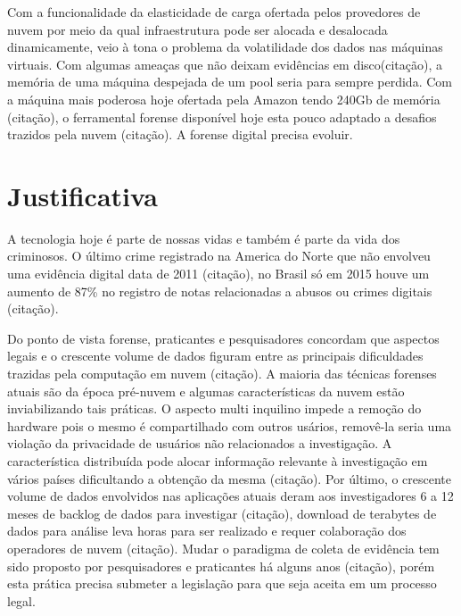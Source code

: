 \documentclass[
	12pt,				%
	openright,			%
	oneside,			%
	a4paper,			%
	english,			%
	french,				%
	spanish,			%
	brazil,				%
	]{abntex2}
\begin{document}
\par

Com a funcionalidade da elasticidade de carga ofertada pelos provedores de nuvem por meio da qual infraestrutura pode ser alocada e desalocada dinamicamente, veio à tona o problema
da volatilidade dos dados nas máquinas virtuais. Com algumas ameaças que não deixam evidências em disco(citação), a memória de uma máquina despejada de um pool seria para sempre
perdida. Com a máquina mais poderosa hoje ofertada pela Amazon tendo 240Gb de memória (citação), o ferramental forense disponível hoje esta pouco adaptado a desafios trazidos 
pela nuvem (citação). A forense digital precisa evoluir.

\chapter{Justificativa}

A tecnologia hoje é parte de nossas vidas e também é parte da vida dos criminosos. O último crime registrado na America do Norte que não envolveu uma evidência digital data de 2011
(citação), no Brasil só em 2015 houve um aumento de 87\% no registro de notas relacionadas a abusos ou crimes digitais (citação).

\par

Do ponto de vista forense, praticantes e pesquisadores concordam que aspectos legais e o crescente volume de dados figuram entre as principais dificuldades trazidas pela computação 
em nuvem (citação). A maioria das técnicas forenses atuais são da época pré-nuvem e algumas características da nuvem estão inviabilizando tais práticas. O aspecto multi inquilino 
impede a remoção do hardware pois o mesmo é compartilhado com outros usários, removê-la seria uma violação da privacidade de usuários não relacionados a investigação. A característica
 distribuída pode alocar informação relevante à investigação em vários países dificultando a obtenção da mesma (citação). Por último, o crescente volume de dados envolvidos nas 
 aplicações atuais deram aos investigadores 6 a 12 meses de backlog de dados para investigar (citação), download de terabytes de dados para análise leva horas para ser realizado e 
 requer colaboração dos operadores de nuvem (citação). Mudar o paradigma de coleta de evidência tem sido proposto por pesquisadores e praticantes há alguns anos (citação), porém esta prática precisa 
 submeter a legislação para que seja aceita em um processo legal.
\end{document}
